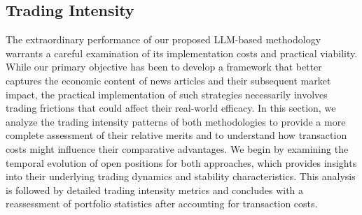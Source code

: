 \subsection{Trading Intensity}
The extraordinary performance of our proposed LLM-based methodology warrants a careful examination of its implementation costs and practical viability. While our primary objective has been to develop a framework that better captures the economic content of news articles and their subsequent market impact, the practical implementation of such strategies necessarily involves trading frictions that could affect their real-world efficacy. In this section, we analyze the trading intensity patterns of both methodologies to provide a more complete assessment of their relative merits and to understand how transaction costs might influence their comparative advantages.
We begin by examining the temporal evolution of open positions for both approaches, which provides insights into their underlying trading dynamics and stability characteristics. This analysis is followed by detailed trading intensity metrics and concludes with a reassessment of portfolio statistics after accounting for transaction costs.

%
%



